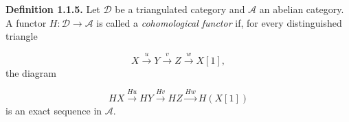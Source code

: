 \medskip
\noindent\textbf{Definition 1.1.5.}\quad
Let $\mathcal D$ be a triangulated category and $\mathcal A$ an abelian
category. A functor $H\colon\mathcal D\longrightarrow\mathcal A$ is
called a \emph{cohomological functor} if, for every distinguished triangle

\[
  X\xrightarrow{u}Y\xrightarrow{v}Z\xrightarrow{w}X[1],
\]
the diagram

\[
  HX\xrightarrow{Hu}HY\xrightarrow{Hv}HZ\xrightarrow{Hw}H(X[1])
\]
is an exact sequence in $\mathcal A$.
\endgroup
